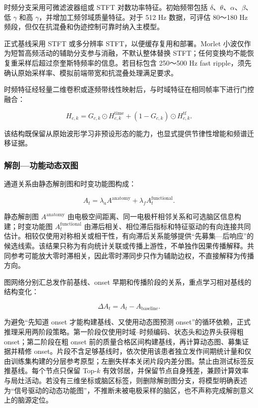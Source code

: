 \documentclass{cumcmthesis_v2}
\numberwithin{figure}{section} %
\numberwithin{table}{section} %
\begin{document}
时频分支采用可微滤波器组或 STFT 对数功率特征。初始频带包括 $\delta$、$\theta$、$\alpha$、$\beta$、低 $\gamma$ 和高 $\gamma$，并增加工频邻域质量特征。对于 512 Hz 数据，可评估 80～180 Hz 频段，但仅在抗混叠和伪迹控制可靠时纳入主模型。

正式基线采用 STFT 或多分辨率 STFT，以便缓存复用和部署。Morlet 小波仅作为短暂高频活动的辅助分支参与消融，不默认整体替换 STFT；任何变换均不能恢复重采样后超过奈奎斯特频率的信息。若目标包含 250～500 Hz fast ripple，须先确认原始采样率、模拟前端带宽和抗混叠处理满足要求。

时频特征经轻量二维卷积或逐频带线性映射后，与时域特征在相同帧率下进行门控融合：

$$
H_{c,k}=
G_{c,k}\odot H^{\mathrm{time}}_{c,k}
+(1-G_{c,k})\odot H^{\mathrm{tf}}_{c,k}.
$$

该结构既保留从原始波形学习非预设形态的能力，也显式提供节律性增能和频谱迁移证据。

\subsubsection{解剖—功能动态双图}

通道关系由静态解剖图和时变功能图构成：

$$
A_t=\lambda_aA^{\mathrm{anatomy}}+\lambda_fA_t^{\mathrm{functional}}.
$$

静态解剖图 $A^{\mathrm{anatomy}}$ 由电极空间距离、同一电极杆相邻关系和可选脑区信息构建；时变功能图 $A_t^{\mathrm{functional}}$ 由滞后相关、相位滞后指标和特征驱动的有向连接共同估计。相较仅使用对称相关或相干性，有向滞后关系能够提供“先募集—后响应”的候选线索。该结果只称为有向统计关联或传播上游性，不单独作因果传播解释。共同参考可能放大零时滞相关，因此零时滞同步只作为辅助边权，不直接解释为传播方向。

图网络分别汇总发作前基线、onset 早期和传播阶段的关系，重点学习相对基线的结构变化：

$$
\Delta A_t=A_t-A_{\mathrm{baseline}}.
$$

为避免“先知道 onset 才能构建基线、又使用动态图预测 onset”的循环依赖，正式推理采用两阶段策略。第一阶段仅使用时域--时频编码、状态头和边界头获得粗 onset；第二阶段在粗 onset 前的质量合格区间构建基线，再计算动态图、募集证据并精修 onset。片段不含足够基线时，依次使用该患者独立发作间期统计量和仅由训练集构建的分层参考原型；左删失样本关闭片段内差分图。禁止由测试标签反推基线。每个节点只保留 Top-$k$ 有效邻居，并保留节点自身残差，兼顾计算效率与局灶活动。若没有三维坐标或脑区标签，则删除解剖图分支，将模型明确表述为“信号驱动的动态功能图”，不推断未被电极采样的脑区，也不声称完成解剖意义上的脑源定位。
\end{document}

